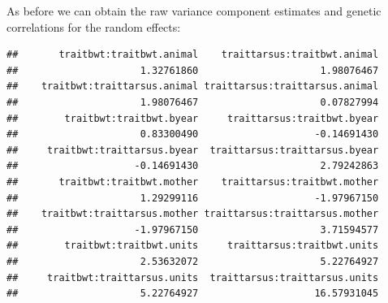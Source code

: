 \documentclass[
  12pt,
]{book}
\newenvironment{Shaded}{\begin{snugshade}}{\end{snugshade}}
\newcommand{\FloatTok}[1]{\textcolor[rgb]{0.00,0.00,0.81}{#1}}
\newcommand{\FunctionTok}[1]{\textcolor[rgb]{0.00,0.00,0.00}{#1}}
\newcommand{\NormalTok}[1]{#1}
\newcommand{\OtherTok}[1]{\textcolor[rgb]{0.56,0.35,0.01}{#1}}
\newcommand{\SpecialCharTok}[1]{\textcolor[rgb]{0.00,0.00,0.00}{#1}}
\newcommand{\StringTok}[1]{\textcolor[rgb]{0.31,0.60,0.02}{#1}}
\begin{document}
As before we can obtain the raw variance component estimates and genetic correlations for the random effects:

\begin{Shaded}
\end{Shaded}

\begin{verbatim}
##       traitbwt:traitbwt.animal    traittarsus:traitbwt.animal 
##                     1.32761860                     1.98076467 
##    traitbwt:traittarsus.animal traittarsus:traittarsus.animal 
##                     1.98076467                     0.07827994 
##        traitbwt:traitbwt.byear     traittarsus:traitbwt.byear 
##                     0.83300490                    -0.14691430 
##     traitbwt:traittarsus.byear  traittarsus:traittarsus.byear 
##                    -0.14691430                     2.79242863 
##       traitbwt:traitbwt.mother    traittarsus:traitbwt.mother 
##                     1.29299116                    -1.97967150 
##    traitbwt:traittarsus.mother traittarsus:traittarsus.mother 
##                    -1.97967150                     3.71594577 
##        traitbwt:traitbwt.units     traittarsus:traitbwt.units 
##                     2.53632072                     5.22764927 
##     traitbwt:traittarsus.units  traittarsus:traittarsus.units 
##                     5.22764927                    16.57931045
\end{verbatim}

\begin{Shaded}
\end{Shaded}
\end{document}
